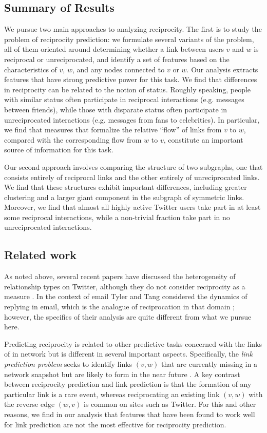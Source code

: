 \documentclass[conference]{IEEEtran}
\begin{document}
\subsection{Summary of Results}

We pursue two main approaches to analyzing reciprocity.
The first is to study the problem of reciprocity prediction:
we formulate several variants of the problem, all of them
oriented around determining whether a link between users $v$ and $w$
is reciprocal or unreciprocated, 
and identify a set of features based on the characteristics of $v$, $w$,
and any nodes connected to $v$ or $w$.  
Our analysis extracts features that have strong predictive
power for this task.
We find that differences in reciprocity can be related to the 
notion of status.
Roughly speaking, people with similar status often participate in reciprocal
interactions (e.g. messages between friends), while those with
disparate status often participate in unreciprocated interactions (e.g.
messages from fans to celebrities).
In particular, we find that measures that formalize the 
relative ``flow'' of links from $v$ to $w$,
compared with the corresponding flow from $w$ to $v$, constitute
an important source of information for this task.

Our second approach involves comparing the structure of two subgraphs, 
one that consists entirely of reciprocal links and the other
entirely of unreciprocated links.
We find that these structures exhibit important differences, including 
greater clustering and a larger giant component in the
subgraph of symmetric links.
Moreover, we find that almost all highly active Twitter users
take part in at least some reciprocal interactions, 
while a non-trivial fraction take part in no unreciprocated interactions.

\subsection{Related work}

As noted above, several recent papers have discussed the 
heterogeneity of relationship types on Twitter,
although they do not consider reciprocity as a measure
\cite{kwak-what-is-twitter,romero-directed-closure}.
In the context of email Tyler and Tang considered the dynamics
of replying in email, which is the analogue of reciprocation
in that domain \cite{Tyler:2003tq}; however, the specifics of their
analysis are quite different from what we pursue here.

Predicting reciprocity is related to other predictive tasks
concerned with the links of in network but is different in several
important aspects.
Specifically, the {\em link prediction problem} seeks to identify
links $(v,w)$ that are currently missing in a network snapshot
but are likely to form in the near future
\cite{liben-nowell-link-pred}.
A key contrast between reciprocity prediction and link prediction
is that the formation of any particular link is a rare event,
whereas reciprocating an existing link $(v,w)$ with
the reverse edge $(w,v)$ is common on sites such as Twitter.
For this and other reasons, we find in our analysis that features 
that have been found to work well for link 
prediction are not the most effective for reciprocity prediction.
\end{document}
